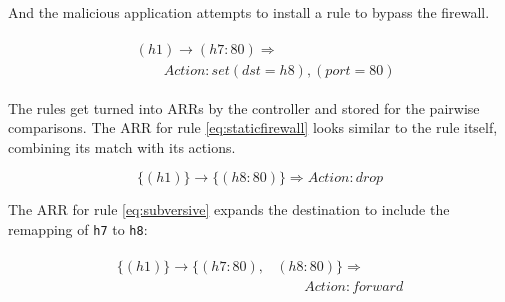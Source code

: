 And the malicious application attempts to install a rule to bypass the firewall.


\begin{align}
\begin{aligned}
\label{eq:subversive}
&(h1) \rightarrow (h7:80) \Rightarrow  \\
    &\qquad Action: set (dst = h8), (port = 80) 
\end{aligned}
\end{align}

The rules get turned into ARRs by the controller and stored for the pairwise comparisons.
The ARR for rule \ref{eq:staticfirewall} looks similar to the rule itself, combining its match with its actions.

\begin{equation}
\{(h1)\} \rightarrow \{(h8:80)\}  \Rightarrow Action: drop \nonumber
\end{equation}

The ARR for rule \ref{eq:subversive} expands the destination to include the remapping of \texttt{h7} to \texttt{h8}:

\begin{align}
\begin{aligned}
\{(h1)\} \rightarrow \{(h7:80),&(h8:80)\} \Rightarrow \\ 
     &\qquad Action: forward \nonumber
\end{aligned}
\end{align}

